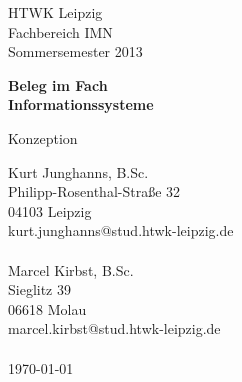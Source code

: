 \documentclass[a4paper,12pt]{scrartcl}
\begin{document}

\begin{titlepage}
HTWK Leipzig\\
Fachbereich IMN \\
Sommersemester 2013




\begin{center}
\begin{Large}
\vfill {\textsf{\textbf{
Beleg im Fach\\Informationssysteme\\
}}}
\end{Large}
Konzeption
\end{center}

\begin{small}
\vfill
Kurt Junghanns, B.Sc.\\
Philipp-Rosenthal-Stra\ss{}e 32\\
04103 Leipzig\\
kurt.junghanns@stud.htwk-leipzig.de\\
\\
Marcel Kirbst, B.Sc.\\
Sieglitz 39 \\
06618 Molau \\
marcel.kirbst@stud.htwk-leipzig.de\\
\\
\today
\end{small}

\end{titlepage}
\addtolength{\voffset}{0cm}
\end{document}
